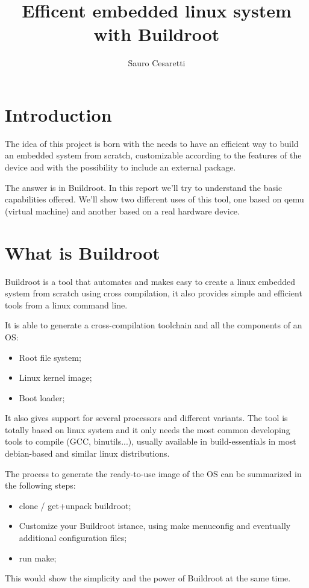 \documentclass[a4paper,twoside,11pt]{article}
\title{Efficent embedded linux system with Buildroot}
\author{Sauro Cesaretti}
\begin{document}
\maketitle

\section{Introduction}
The idea of this project is born with the needs to have an efficient way to build an embedded system from scratch, customizable according to the features of the device and with the possibility to include an external package.

The answer is in Buildroot.
In this report we'll try to understand the basic capabilities offered.
We'll show two different uses of this tool, one based on qemu (virtual machine) and another based on a real hardware device.

 
\section{What is Buildroot}
Buildroot is a tool that automates and makes easy to create a linux embedded system from scratch using cross compilation, it also provides simple and efficient tools from a linux command line.

It is able to generate a cross-compilation toolchain and all the components of an OS:
\begin{itemize}
\item Root file system;
\item Linux kernel image;
\item Boot loader;
\end{itemize}

It also gives support for several processors and different variants.
The tool is totally based on linux system and it only needs the most common developing tools to compile (GCC, binutils...), usually available in build-essentials in most debian-based and similar linux distributions.

The process to generate the ready-to-use image of the OS can be summarized in the following steps:
\begin{itemize}
\item clone / get+unpack buildroot;
\item Customize your Buildroot istance, using make menuconfig and eventually additional configuration files;
\item run make; 
\end{itemize}
This would show the simplicity and the power of Buildroot at the same time.
\end{document}
